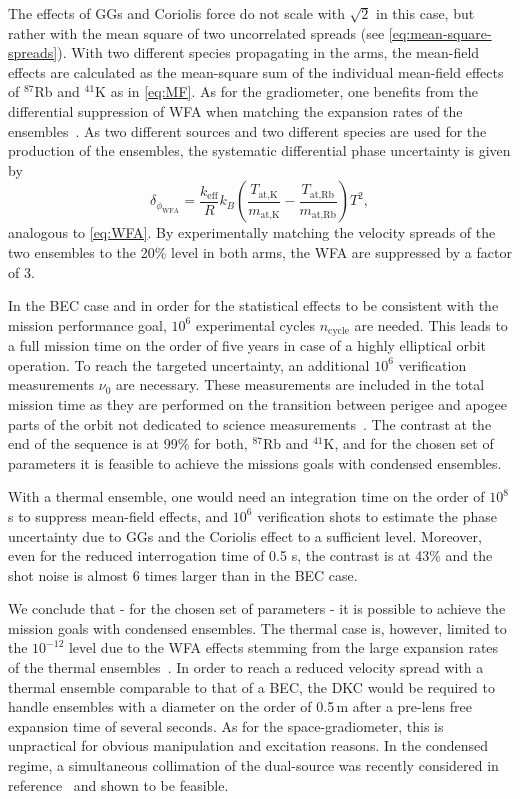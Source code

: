 The effects of GGs and Coriolis force do not scale with $\sqrt{2}$ in this case, but rather with the mean square of two uncorrelated spreads (see \autoref{eq:mean-square-spreads}).
With two different species propagating in the arms, the mean-field effects are calculated as the mean-square sum of the individual mean-field effects of $^{87}$Rb and $^{41}$K as in \autoref{eq:MF}.
As for the gradiometer, one benefits from the differential suppression of WFA when matching the expansion rates of the ensembles~\cite{Aguilera2014}. As two different sources and two different species are used for the production of the ensembles, the systematic differential phase uncertainty is given by
\begin{equation}
    \delta_{\phi_\text{WFA}}= \frac{k_\text{eff}}{R} k_B \left(\frac{T_\text{at,K}}{m_\text{at,K}}-\frac{T_\text{at,Rb}}{m_\text{at,Rb}}\right)T^2,
\end{equation}
analogous to \autoref{eq:WFA}. 
By experimentally matching the velocity spreads of the two ensembles to the 20\% level in both arms, the WFA are suppressed by a factor of 3.

In the BEC case and in order for the statistical effects to be consistent with the mission performance goal, $10^6$ experimental cycles $n_\text{cycle}$ are needed. This leads to a full mission time on the order of five years in case of a highly elliptical orbit operation.
To reach the targeted uncertainty, an additional $10^6$ verification measurements $\nu_0$ are necessary. These measurements are included in the total mission time as they are performed on the transition between perigee and apogee parts of the orbit not dedicated to science measurements~\cite{Aguilera2014}. The contrast at the end of the sequence is at 99\% for both, $^{87}$Rb and $^{41}$K, and for the chosen set of parameters it is feasible to achieve the missions goals with condensed ensembles.

With a thermal ensemble, one would need an integration time on the order of $10^8$ s to suppress mean-field effects, and $10^6$ verification shots to estimate the phase uncertainty due to GGs and the Coriolis effect to a sufficient level. Moreover, even for the reduced interrogation time of 0.5 s, the contrast is at 43\% and the shot noise is almost 6 times larger than in the BEC case.

We conclude that - for the chosen set of parameters - it is possible to achieve the mission goals with condensed ensembles. The thermal case is, however, limited to the $10^{-12}$ level due to the WFA effects stemming from the large expansion rates of the thermal ensembles~\cite{Karcher2018}. In order to reach a reduced velocity spread with a thermal ensemble comparable to that of a BEC, the DKC would be required to handle ensembles with a diameter on the order of 0.5\,m after a pre-lens free expansion time of several seconds. As for the space-gradiometer, this is unpractical for obvious manipulation and excitation reasons. In the condensed regime, a simultaneous collimation of the dual-source was recently considered in reference~\cite{Corgier2020} and shown to be feasible.
%
